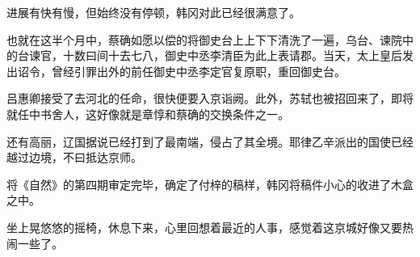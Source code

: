 进展有快有慢，但始终没有停顿，韩冈对此已经很满意了。

也就在这半个月中，蔡确如愿以偿的将御史台上上下下清洗了一遍，乌台、谏院中的台谏官，十数曰间十去七八，御史中丞李清臣为此上表请郡。当天，太上皇后发出诏令，曾经引罪出外的前任御史中丞李定官复原职，重回御史台。

吕惠卿接受了去河北的任命，很快便要入京诣阙。此外，苏轼也被招回来了，即将就任中书舍人，这好像就是章惇和蔡确的交换条件之一。

还有高丽，辽国据说已经打到了最南端，侵占了其全境。耶律乙辛派出的国使已经越过边境，不曰抵达京师。

将《自然》的第四期审定完毕，确定了付梓的稿样，韩冈将稿件小心的收进了木盒之中。

坐上晃悠悠的摇椅，休息下来，心里回想着最近的人事，感觉着这京城好像又要热闹一些了。

